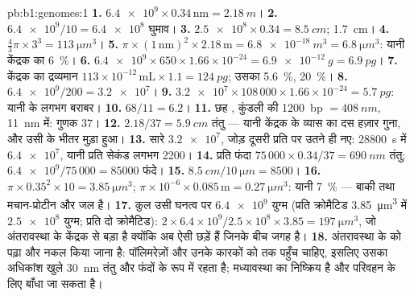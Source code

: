 \begin{solution}{pb:b1:genomes:1}
\textbf{1.} $\num{6.4e9}\times 0.34\,\mathrm{nm} = \qty{2.18}{m}$।
\textbf{2.} $\num{6.4e9}/10 = \num{6.4e8}$ घुमाव।
\textbf{3.} $\num{2.5e8}\times 0.34 = \qty{8.5}{cm}$; \qty{1.7}{cm}।
\textbf{4.} $\frac{4}{3}\pi\times 3^3 = \qty{113}{\micro m^3}$।
\textbf{5.} $\pi\times(1\,\mathrm{nm})^2\times 2.18\,\mathrm{m} =
\qty{6.8e-18}{m^3} = \qty{6.8}{\micro m^3}$: यानी केंद्रक का \qty{6}{\%}।
\textbf{6.} $\num{6.4e9}\times 650\times 1.66\times 10^{-24} =
\qty{6.9e-12}{g} = \qty{6.9}{pg}$।
\textbf{7.} केंद्रक का द्रव्यमान $113\times 10^{-12}\,\mathrm{mL}\times 1.1 =
\qty{124}{pg}$;  उसका \qty{5.6}{\%},  \qty{20}{\%}।
\textbf{8.} $\num{6.4e9}/200 = \num{3.2e7}$।
\textbf{9.} $\num{3.2e7}\times 108\,000\times 1.66\times 10^{-24} =
\qty{5.7}{pg}$: यानी  के लगभग बराबर।
\textbf{10.} $68/11 = 6.2$।
\textbf{11.} छह , कुंडली की \qty{1200}{bp} $= \qty{408}{nm}$,
\qty{11}{nm} में: गुणक $37$।
\textbf{12.} $2.18/37 = \qty{5.9}{cm}$ तंतु --- यानी केंद्रक के व्यास
का दस हज़ार गुना, और उसी के भीतर मुड़ा हुआ।
\textbf{13.} सारे $\num{3.2e7}$, जोड़ दूसरी प्रति पर उतने ही नए:
\qty{28800}{s} में $\num{6.4e7}$, यानी प्रति सेकंड लगभग \num{2200}।
\textbf{14.} प्रति फंदा $75\,000\times 0.34/37 = \qty{690}{nm}$ तंतु;
$\num{6.4e9}/75\,000 = \num{85000}$ फंदे।
\textbf{15.} $\qty{8.5}{cm}/\qty{10}{\micro m} = 8500$।
\textbf{16.} $\pi\times 0.35^2\times 10 = \qty{3.85}{\micro m^3}$; 
$\pi\times 10^{-6}\times 0.085\,\mathrm{m} = \qty{0.27}{\micro m^3}$:
यानी \qty{7}{\%} --- बाकी  तथा मचान-प्रोटीन और जल है।
\textbf{17.} कुल  उसी घनत्व पर $\num{6.4e9}$ युग्म
(प्रति क्रोमैटिड \qty{3.85}{\micro m^3} में $\num{2.5e8}$ युग्म; प्रति
 दो क्रोमैटिड): $2\times 6.4\times 10^9/2.5\times 10^8\times
3.85 = \qty{197}{\micro m^3}$, जो अंतरावस्था के केंद्रक से बड़ा है
क्योंकि  अब ऐसी छड़ें हैं जिनके बीच जगह है।
\textbf{18.} अंतरावस्था के  को पढ़ा और नकल किया जाना है:
पॉलिमरेज़ों और उनके कारकों को  तक पहुँच चाहिए, इसलिए उसका अधिकांश
खुले \qty{30}{nm} तंतु और फंदों के रूप में रहता है; मध्यावस्था का
 निष्क्रिय है और परिवहन के लिए बाँधा जा सकता है।

\end{solution}
